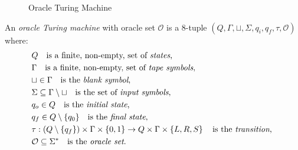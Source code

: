\begin{figure}[t]
\centering
{}
\caption{\label{fig:Oracle-Turing-Machine}Oracle Turing Machine}
\end{figure}

\begin{definition}
\label{def:Oracle-Turing-Machine}
An \emph{oracle Turing machine} with oracle set $\mathcal{O}$ is a 8-tuple $\left(Q, \Gamma, \sqcup, \Sigma, q_i, q_f, \tau, \mathcal{O} \right)$ where:
\begin{align*}
 & Q \quad \text{is a finite, non-empty, set of \emph{states},} \index{Machine State} \\
 & \Gamma \quad \text{is a finite, non-empty, set of \emph{tape symbols},} \index{Tape Symbol} \\
 & \sqcup\in\Gamma \quad \text{is the \emph{blank symbol},} \index{Blank Symbol} \\
 & \Sigma\subseteq\Gamma\setminus\sqcup \quad \text{is the set of \emph{input symbols},}  \index{Input Symbol} \\
 & q_{o}\in Q \quad \text{is the \emph{initial state},} \index{Initial State} \\
 & q_{f}\in Q \setminus \{q_0\} \quad \text{is the \emph{final state},} \index{Final State} \\ 
 & \tau: \left(Q \setminus \{q_{f}\}\right) \times \Gamma \times \{0, 1\} \rightarrow  Q\times\Gamma\times\left\{ L,R,S\right\} \quad\text{is the \emph{transition}, \index{Transition Function} } \\
 & \mathcal{O} \subseteq \Sigma^\ast \quad \text{is the \emph{oracle set}.}
\end{align*}
\end{definition}

